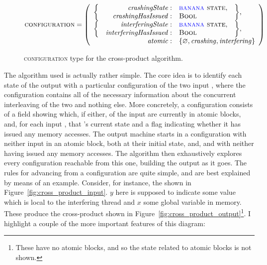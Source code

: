 \begin{figure}
  \begin{displaymath}
    \textsc{configuration} = \left(\begin{array}{rrll}
      \multirow{2}{*}{\bigg\{} & \mathit{crashingState}: & \textsc{{\StateMachine} state}, & \multirow{2}{*}{\bigg\},}\\
                               & \mathit{crashingHasIssued}: & \textsc{Bool}\\
      \multirow{2}{*}{\bigg\{} & \mathit{interferingState}: & \textsc{{\StateMachine} state}, & \multirow{2}{*}{\bigg\},} \\
                               & \mathit{interferingHasIssued}: & \textsc{Bool}\\
      \multicolumn{2}{r}{\mathit{atomic}:} & \multicolumn{2}{l}{\{ \varnothing, \mathit{crashing}, \mathit{interfering} \}}
    \end{array}\right)
  \end{displaymath}
  \caption{\textsc{configuration} type for the cross-product algorithm.}
  \label{fig:cross_product:configuration}
\end{figure}

The algorithm used is actually rather simple.  The core idea is to
identify each state of the output {\StateMachine} with a particular
configuration of the two input {\StateMachines}, where the
configuration contains all of the necessary information about the
concurrent interleaving of the two {\StateMachines} and nothing else.
More concretely, a configuration consists of a field showing which, if
either, of the input {\StateMachines} are currently in atomic blocks,
and, for each input {\StateMachine}, that {\StateMachine}'s current
state and a flag indicating whether it has issued any memory accesses.
The output machine starts in a configuration with neither input
{\StateMachine} in an atomic block, both {\StateMachines} at their
initial state, and, and with neither having issued any memory
accesses.  The algorithm then exhaustively explores every
configuration reachable from this one, building the output
{\StateMachine} as it goes.  The rules for advancing from a
configuration are quite simple, and are best explained by means of an
example.  Consider, for instance, the {\StateMachines} shown in
Figure~\ref{fig:cross_product_input}.  $y$ here is supposed to
indicate some value which is local to the interfering thread
{\StateMachine} and $x$ some global variable in memory.  These produce
the cross-product {\StateMachine} shown in
Figure~\ref{fig:cross_product_output}\footnote{These {\StateMachines}
  have no atomic blocks, and so the state related to atomic blocks is
  not shown.}.  I highlight a couple of the more important features of
this diagram:

